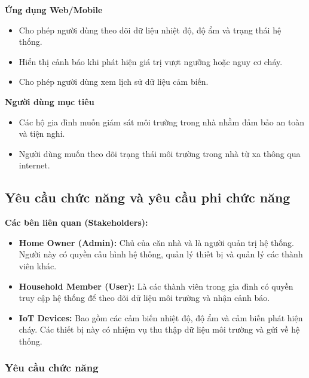\documentclass[a4paper,twoside]{article}
\begin{document}
\textbf{Ứng dụng Web/Mobile}

\begin{itemize}

\item Cho phép người dùng theo dõi dữ liệu nhiệt độ,
độ ẩm và trạng thái hệ thống.

\item Hiển thị cảnh báo khi phát hiện giá trị vượt ngưỡng
hoặc nguy cơ cháy.

\item Cho phép người dùng xem lịch sử dữ liệu cảm biến.

\end{itemize}

\textbf{Người dùng mục tiêu}

\begin{itemize}

\item Các hộ gia đình muốn giám sát môi trường trong nhà
nhằm đảm bảo an toàn và tiện nghi.

\item Người dùng muốn theo dõi trạng thái môi trường
trong nhà từ xa thông qua internet.

\end{itemize}

\subsection{Yêu cầu chức năng và yêu cầu phi chức năng}

\textbf{Các bên liên quan (Stakeholders):}

\begin{itemize}

\item \textbf{Home Owner (Admin):}  
Chủ của căn nhà và là người quản trị hệ thống.
Người này có quyền cấu hình hệ thống, quản lý thiết bị
và quản lý các thành viên khác.

\item \textbf{Household Member (User):}  
Là các thành viên trong gia đình có quyền truy cập
hệ thống để theo dõi dữ liệu môi trường và nhận cảnh báo.

\item \textbf{IoT Devices:}  
Bao gồm các cảm biến nhiệt độ, độ ẩm và cảm biến phát hiện cháy.
Các thiết bị này có nhiệm vụ thu thập dữ liệu môi trường
và gửi về hệ thống.

\end{itemize}

\subsubsection{Yêu cầu chức năng}
\end{document}
